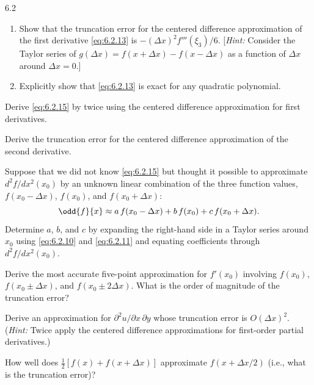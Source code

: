 \begin{exercises}{6.2}
\item
\begin{enumerate}
\item[(a)] Show that the truncation error for the centered difference approximation of the first derivative \eqref{eq:6.2.13} is $-(\Delta x)^2 f'''(\xi_3)/6$.  [\emph{Hint:} Consider the Taylor series of $g(\Delta x) = f(x + \Delta x) - f(x - \Delta x)$ as a function of $\Delta x$ around $\Delta x = 0$.]

\item[(b)] Explicitly show that \eqref{eq:6.2.13} is exact for any quadratic polynomial.
\end{enumerate}

\item Derive \eqref{eq:6.2.15} by twice using the centered difference approximation for first derivatives.

\item Derive the truncation error for the centered difference approximation of the second derivative.

\item Suppose that we did not know \eqref{eq:6.2.15} but thought it possible to approximate $d^2f/dx^2(x_0)$ by an unknown linear combination of the three function values, $f(x_0 - \Delta x)$, $f(x_0)$, and $f(x_0 + \Delta x)$:
\[
\odd{f}{x} \approx a\,f(x_0 - \Delta x) + b\,f(x_0) + c\,f(x_0 + \Delta x).
\]
Determine $a$, $b$, and $c$ by expanding the right-hand side in a Taylor series around $x_0$ using \eqref{eq:6.2.10} and \eqref{eq:6.2.11} and equating coefficients through $d^2f/dx^2(x_0)$.

\item Derive the most accurate five-point approximation for $f'(x_0)$ involving $f(x_0)$, $f(x_0 \pm \Delta x)$, and $f(x_0 \pm 2\Delta x)$.  What is the order of magnitude of the truncation error?

\item[\starred 6.2.6.] Derive an approximation for $\partial^2 u/\partial x\,\partial y$ whose truncation error is $O(\Delta x)^2$.  (\emph{Hint:} Twice apply the centered difference approximations for first-order partial derivatives.)

\item How well does $\tfrac{1}{2}[f(x) + f(x + \Delta x)]$ approximate $f(x + \Delta x/2)$ (i.e., what is the truncation error)?
\end{exercises}

